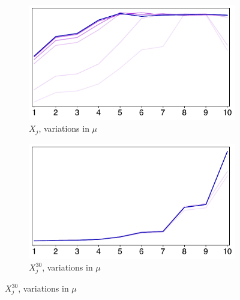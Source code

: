 \documentclass[../main.tex]{subfiles}
\begin{document}
\begin{figure}[H]
    \vspace{0.3cm}

    \begin{subfigure}[b]{0.39\linewidth}
        \centering
        \includegraphics[width=\linewidth]{mu_id1.pdf}
        \vspace{-0.6cm}
        \caption{$X_j$, variations in $\mu$}
        \label{fig:mu1}
    \end{subfigure}
    \hspace{0.07\linewidth}  %
    \begin{subfigure}[b]{0.39\linewidth}
        \centering
        \includegraphics[width=\linewidth]{mu_id2.pdf}
        \vspace{-0.6cm}
        \caption{$X_j^{30}$, variations in $\mu$}
        \label{fig:mu2}
    \end{subfigure}

    \vspace{0.3cm}


\end{figure}
\end{document}
